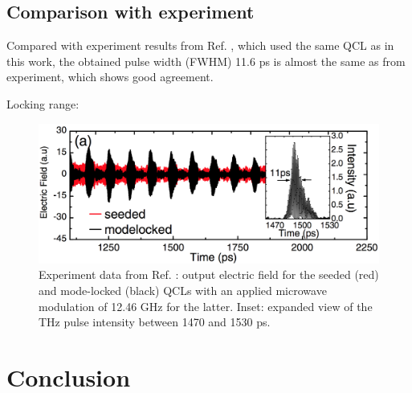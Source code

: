 \documentclass[11pt,final]{scrbook}
\begin{document}
\section{Comparison with experiment}
Compared with experiment results from Ref. \cite{wang2015generating}, which used the same QCL as in this work, the obtained pulse width (FWHM) 11.6 ps is almost the same as from experiment, which shows good agreement.  

Locking range:
\begin{figure}[htbp]
\begin{center}
\includegraphics[scale=0.4]{images/comparison.pdf}
\caption{Experiment data from Ref. \cite{wang2015generating}: output electric field for the seeded (red) and mode-locked (black) QCLs with an applied microwave modulation of 12.46 GHz for the latter. Inset: expanded view of the THz pulse intensity between 1470 and 1530 ps. }
\label{fig:comparison}
\end{center}
\end{figure}
\chapter{Conclusion}





\renewcommand*{\bibname}{Bibliography} %
{}


\end{document}
